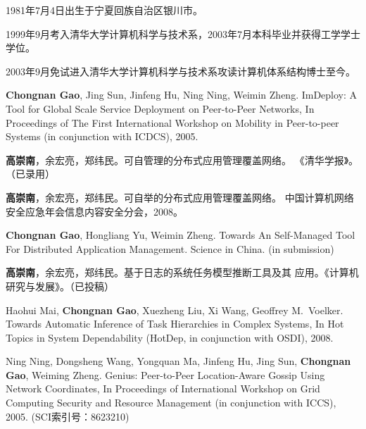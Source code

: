 \begin{resume}


  1981年7月4日出生于宁夏回族自治区银川市。

  1999年9月考入清华大学计算机科学与技术系，2003年7月本科毕业并获得工学学士学位。

  2003年9月免试进入清华大学计算机科学与技术系攻读计算机体系结构博士至今。


  \begin{enumerate}[{[}1{]}]

  \item \textbf{Chongnan Gao}, Jing Sun, Jinfeng Hu, Ning Ning, Weimin
  Zheng.  ImDeploy: A Tool for Global Scale Service Deployment on
  Peer-to-Peer Networks, In Proceedings of The First International Workshop
  on Mobility in Peer-to-peer Systems (in conjunction with ICDCS), 2005.

  \item \textbf{高崇南}，余宏亮，郑纬民。可自管理的分布式应用管理覆盖网络。
  《清华学报》。（已录用）

  \item \textbf{高崇南}，余宏亮，郑纬民。可自举的分布式应用管理覆盖网络。
  中国计算机网络安全应急年会信息内容安全分会，2008。

  \item \textbf{Chongnan Gao}, Hongliang Yu, Weimin Zheng. Towards An
  Self-Managed Tool For Distributed Application Management. Science in
  China. (in submission)

  \item \textbf{高崇南}，余宏亮，郑纬民。基于日志的系统任务模型推断工具及其
  应用。《计算机研究与发展》。（已投稿）

  \item Haohui Mai, \textbf{Chongnan Gao}, Xuezheng Liu, Xi Wang, Geoffrey
  M.\ Voelker. Towards Automatic Inference of Task Hierarchies in Complex
  Systems, In Hot Topics in System Dependability (HotDep, in conjunction
  with OSDI), 2008.

  \item Ning Ning, Dongsheng Wang, Yongquan Ma, Jinfeng Hu, Jing Sun,
  \textbf{Chongnan Gao}, Weiming Zheng. Genius: Peer-to-Peer Location-Aware
  Gossip Using Network Coordinates, In Proceedings of International Workshop
  on Grid Computing Security and Resource Management (in conjunction with
  ICCS), 2005. (SCI索引号：8623210)


\end{enumerate}
\end{resume}
